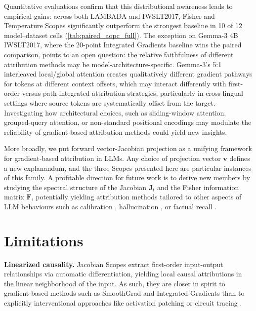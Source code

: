 \documentclass{article}
\begin{document}
Quantitative evaluations confirm that this distributional awareness leads to empirical gains: across both LAMBADA and IWSLT2017, Fisher and Temperature Scopes significantly outperform the strongest baseline in 10 of 12 model--dataset cells (\cref{tab:paired_aopc_full}).
The exception on Gemma-3 4B IWSLT2017, where the 20-point Integrated Gradients baseline wins the paired comparison, points to an open question: the relative faithfulness of different attribution methods may be model-architecture-specific.
Gemma-3's 5:1 interleaved local/global attention \citep{gemmateam2025gemma3technicalreport} creates qualitatively different gradient pathways for tokens at different context offsets, which may interact differently with first-order versus path-integrated attribution strategies, particularly in cross-lingual settings where source tokens are systematically offset from the target.
Investigating how architectural choices, such as sliding-window attention, grouped-query attention, or non-standard positional encodings may modulate the reliability of gradient-based attribution methods could yield new insights.

More broadly, we put forward vector-Jacobian projection as a unifying framework for gradient-based attribution in LLMs.
Any choice of projection vector $\bm{v}$ defines a new explanandum, and the three Scopes presented here are particular instances of this family.
A profitable direction for future work is to derive new members by studying the spectral structure of the Jacobian $\bm{J}_t$ and the Fisher information matrix $\bm{F}$, potentially yielding attribution methods tailored to other aspects of LLM behaviours
such as calibration \cite{guo2017calibration}, hallucination \cite{varshney2023stitch}, or factual recall \cite{meng2022locating}.

\section*{Limitations}
\textbf{Linearized causality.}
Jacobian Scopes extract first-order input-output relationships via automatic differentiation, yielding local causal attributions in the linear neighborhood of the input. 
As such, they are closer in spirit to gradient-based methods such as SmoothGrad \cite{smilkov2017smoothgradremovingnoiseadding} and Integrated Gradients \cite{Sundararajan-Axiomatic-Attribution-DNN-2017,sanyal2021discretizedintegratedgradientsexplaining} 
than to explicitly interventional approaches like activation patching \cite{heimersheim2024useinterpretactivationpatching,pmlr-v235-ghandeharioun24a} or circuit tracing \cite{ameisen2025circuit}.
\end{document}
